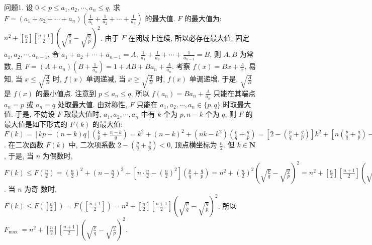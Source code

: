 
问题1. 设 $0<p \leqslant a_1, a_2, \cdots, a_n \leqslant q$, 求 $F=\left(a_1+a_2+\cdots+\right. \left.a_n\right)\left(\frac{1}{a_1}+\frac{1}{a_2}+\cdots+\frac{1}{a_n}\right)$ 的最大值.
$F$ 的最大值为: $n^2+\left[\frac{n}{2}\right]\left[\frac{n+1}{2}\right]\left(\sqrt{\frac{p}{q}}-\sqrt{\frac{q}{p}}\right)^2$. 由于 $F$ 在闭域上连续, 所以必存在最大值.
固定 $a_1, a_2, \cdots, a_{n-1}$, 令 $a_1+a_2+\cdots+a_{n-1}=A$, $\frac{1}{a_1}+\frac{1}{a_2}+\cdots+\frac{1}{a_{n-1}}=B$, 则 $A, B$ 为常数, 且 $F=\left(A+a_n\right)\left(B+\frac{1}{a_n}\right)=1+A B+B a_n+\frac{A}{a_n}$. 考察 $f(x)=B x+\frac{A}{x}$, 易知, 当 $x \leqslant \sqrt{\frac{A}{B}}$ 时, $f(x)$ 单调递减, 当 $x \geqslant \sqrt{\frac{A}{B}}$ 时, $f(x)$ 单调递增.
于是, $\sqrt{\frac{A}{B}}$ 是 $f(x)$ 的最小值点.
注意到 $p \leqslant a_n \leqslant q$, 所以 $f\left(a_n\right)=B a_n+\frac{A}{a_n}$ 只能在其端点 $a_n=p$ 或 $a_n=q$ 处取最大值.
由对称性, $F$ 只能在 $a_1, a_2, \cdots, a_n \in\{p, q\}$ 时取最大值.
于是, 不妨设 $F$ 取最大值时, $a_1, a_2, \cdots, a_n$ 中有 $k$ 个为 $p, n-k$ 个为 $q$, 则 $F$ 的最大值是如下形式的 $F(k)$ 的最大值: $F(k)=[k p+(n-k) q]\left(\frac{k}{p}+\frac{n-k}{q}\right)=k^2+(n- k)^2+\left(n k-k^2\right)\left(\frac{p}{q}+\frac{q}{p}\right)=\left[2-\left(\frac{p}{q}+\frac{q}{p}\right)\right] k^2+\left[n\left(\frac{p}{q}+\frac{q}{p}\right)-2 n\right] k+n^2$. 在二次函数 $F(k)$ 中, 二次项系数 $2-\left(\frac{p}{q}+\frac{q}{p}\right)<0$, 顶点横坐标为 $\frac{n}{2}$. 但 $k \in \mathbf{N}$, 于是, 当 $n$ 为偶数时, $F(k) \leqslant F\left(\frac{n}{2}\right)=\left(\frac{n}{2}\right)^2+\left(n-\frac{n}{2}\right)^2+ \left[n \cdot \frac{n}{2}-\left(\frac{n}{2}\right)^2\right]\left(\frac{p}{q}+\frac{q}{p}\right)=n^2+\left(\frac{n}{2}\right)^2\left(\sqrt{\frac{p}{q}}-\sqrt{\frac{q}{p}}\right)^2=n^2+ \left[\frac{n}{2}\right]\left[\frac{n+1}{2}\right]\left(\sqrt{\frac{p}{q}}-\sqrt{\frac{q}{p}}\right)^2$. 当 $n$ 为奇 数时, $F(k) \leqslant F\left(\left[\frac{n}{2}\right]\right)= F\left(\left[\frac{n+1}{2}\right]\right)=n^2+\left[\frac{n}{2}\right]\left[\frac{n+1}{2}\right]\left(\sqrt{\frac{p}{q}}-\sqrt{\frac{q}{p}}\right)^2$. 所以 $F_{\text {max }}=n^2+ \left[\frac{n}{2}\right]\left[\frac{n+1}{2}\right]\left(\sqrt{\frac{p}{q}}-\sqrt{\frac{q}{p}}\right)^2$.



